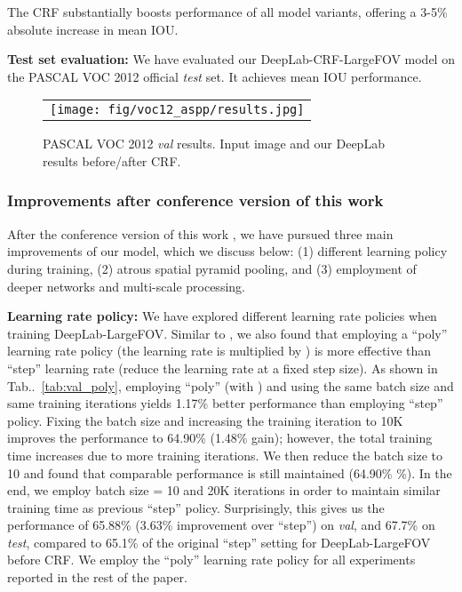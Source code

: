 \documentclass[10pt,journal,compsoc]{IEEEtran}
\makeatletter
\newcommand{\tabref}[1]{Tab\onedot~\ref{#1}}
\def\onedot{\ifx\@let@token.\else.\null\fi\xspace}
\makeatother
\begin{document}
The CRF substantially boosts performance of all model variants, offering a 3-5\%
absolute increase in mean IOU.














\textbf{Test set evaluation:} We have evaluated our DeepLab-CRF-LargeFOV model
on the PASCAL VOC 2012 official \textit{test} set. It achieves  mean IOU
performance.















\begin{figure*}[!htbp]
  \centering
\scalebox{0.55} {
  \begin{tabular}{c}
    \texttt{[image: fig/voc12\_aspp/results.jpg]}\\
  \end{tabular}
  }
\caption{PASCAL VOC 2012 \textit{val} results. Input image
    and our DeepLab results before/after CRF.}
  \label{fig:ValResults}
\end{figure*}


\subsubsection{Improvements after conference version of this work}
After the conference version of this work \cite{chen2014semantic}, we have
pursued three main improvements of our model, which we discuss below:
(1) different learning policy during training, (2) atrous spatial pyramid
pooling, and (3) employment of deeper networks and multi-scale processing.

\textbf{Learning rate policy:} We have explored different learning rate
policies when training DeepLab-LargeFOV. Similar to \cite{liu2015parsenet},
we also found that employing a ``poly'' learning rate policy (the learning
rate is multiplied by ) is more effective
than ``step'' learning rate (reduce the learning rate at a fixed step size).
As shown in \tabref{tab:val_poly}, employing ``poly'' (with )
and using the same batch size and same training iterations yields 1.17\% better
performance than employing ``step'' policy. Fixing the batch size and increasing
the training iteration to 10K improves the performance to 64.90\% (1.48\% gain);
however, the total training time increases due to more training iterations. We
then reduce the batch size to 10 and found that comparable performance is still
maintained (64.90\% \%). In the end, we employ batch size = 10 and
20K iterations in order to maintain similar training time as previous ``step''
policy. Surprisingly, this gives us the performance of 65.88\% (3.63\%
improvement over ``step'') on \textit{val}, and 67.7\% on \textit{test},
compared to 65.1\% of the original ``step'' setting for DeepLab-LargeFOV before
CRF. We employ the ``poly'' learning rate policy for all experiments reported in
the rest of the paper.
\end{document}
